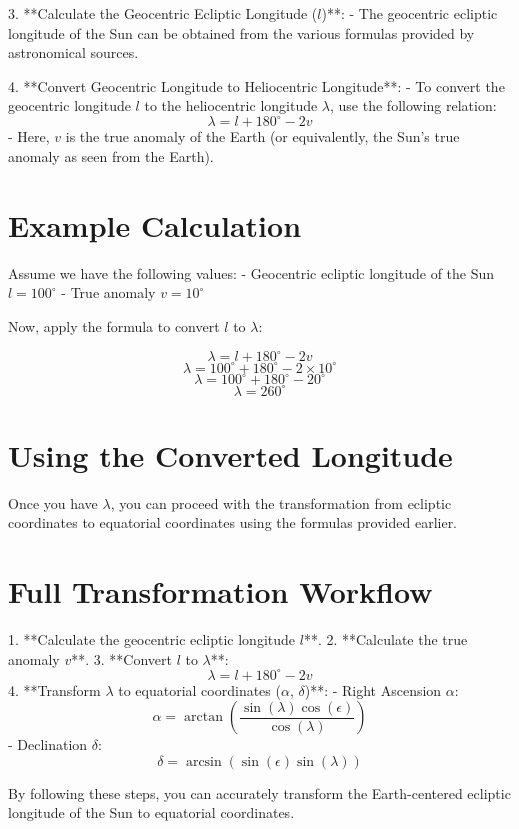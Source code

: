 \documentclass[12pt,a4paper]{article}
\begin{document}
	3. **Calculate the Geocentric Ecliptic Longitude (\(l\))**:
	- The geocentric ecliptic longitude of the Sun can be obtained from the various formulas provided by astronomical sources.
	
	4. **Convert Geocentric Longitude to Heliocentric Longitude**:
	- To convert the geocentric longitude \(l\) to the heliocentric longitude \(\lambda\), use the following relation:
	\[
	\lambda = l + 180^\circ - 2v
	\]
	- Here, \(v\) is the true anomaly of the Earth (or equivalently, the Sun's true anomaly as seen from the Earth).
	
	\section{Example Calculation} 
	
	Assume we have the following values:
	- Geocentric ecliptic longitude of the Sun \(l = 100^\circ\)
	- True anomaly \(v = 10^\circ\)
	
	Now, apply the formula to convert \(l\) to \(\lambda\):
	
	\[
	\lambda = l + 180^\circ - 2v
	\]
	\[
	\lambda = 100^\circ + 180^\circ - 2 \times 10^\circ
	\]
	\[
	\lambda = 100^\circ + 180^\circ - 20^\circ
	\]
	\[
	\lambda = 260^\circ
	\]
	
	\section{Using the Converted Longitude}
	
	Once you have \(\lambda\), you can proceed with the transformation from ecliptic coordinates to equatorial coordinates using the formulas provided earlier.
	
	\section{Full Transformation Workflow}
	
	1. **Calculate the geocentric ecliptic longitude \(l\)**.
	2. **Calculate the true anomaly \(v\)**.
	3. **Convert \(l\) to \(\lambda\)**:
	\[
	\lambda = l + 180^\circ - 2v
	\]
	4. **Transform \(\lambda\) to equatorial coordinates (\(\alpha\), \(\delta\))**:
	- Right Ascension \(\alpha\):
	\[
	\alpha = \arctan \left( \frac{\sin(\lambda) \cos(\epsilon)}{\cos(\lambda)} \right)
	\]
	- Declination \(\delta\):
	\[
	\delta = \arcsin (\sin(\epsilon) \sin(\lambda))
	\]
	
	By following these steps, you can accurately transform the Earth-centered ecliptic longitude of the Sun to equatorial coordinates.
\end{document}
